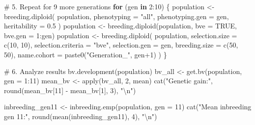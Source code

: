\documentclass[
  letterpaper,
]{book}
\newenvironment{Shaded}{\begin{snugshade}}{\end{snugshade}}
\newcommand{\AttributeTok}[1]{\textcolor[rgb]{0.40,0.45,0.13}{#1}}
\newcommand{\CommentTok}[1]{\textcolor[rgb]{0.37,0.37,0.37}{#1}}
\newcommand{\ConstantTok}[1]{\textcolor[rgb]{0.56,0.35,0.01}{#1}}
\newcommand{\ControlFlowTok}[1]{\textcolor[rgb]{0.00,0.23,0.31}{\textbf{#1}}}
\newcommand{\DecValTok}[1]{\textcolor[rgb]{0.68,0.00,0.00}{#1}}
\newcommand{\FloatTok}[1]{\textcolor[rgb]{0.68,0.00,0.00}{#1}}
\newcommand{\FunctionTok}[1]{\textcolor[rgb]{0.28,0.35,0.67}{#1}}
\newcommand{\NormalTok}[1]{\textcolor[rgb]{0.00,0.23,0.31}{#1}}
\newcommand{\OtherTok}[1]{\textcolor[rgb]{0.00,0.23,0.31}{#1}}
\newcommand{\SpecialCharTok}[1]{\textcolor[rgb]{0.37,0.37,0.37}{#1}}
\newcommand{\StringTok}[1]{\textcolor[rgb]{0.13,0.47,0.30}{#1}}
\begin{document}
\begin{Shaded}
\begin{Highlighting}[]
\CommentTok{\# 5. Repeat for 9 more generations}
\ControlFlowTok{for}\NormalTok{ (gen }\ControlFlowTok{in} \DecValTok{2}\SpecialCharTok{:}\DecValTok{10}\NormalTok{) \{}
\NormalTok{  population }\OtherTok{\textless{}{-}} \FunctionTok{breeding.diploid}\NormalTok{(}
\NormalTok{    population, }\AttributeTok{phenotyping =} \StringTok{"all"}\NormalTok{, }\AttributeTok{phenotyping.gen =}\NormalTok{ gen, }\AttributeTok{heritability =} \FloatTok{0.5}
\NormalTok{  )}
\NormalTok{  population }\OtherTok{\textless{}{-}} \FunctionTok{breeding.diploid}\NormalTok{(population, }\AttributeTok{bve =} \ConstantTok{TRUE}\NormalTok{, }\AttributeTok{bve.gen =} \DecValTok{1}\SpecialCharTok{:}\NormalTok{gen)}
\NormalTok{  population }\OtherTok{\textless{}{-}} \FunctionTok{breeding.diploid}\NormalTok{(}
\NormalTok{    population, }\AttributeTok{selection.size =} \FunctionTok{c}\NormalTok{(}\DecValTok{10}\NormalTok{, }\DecValTok{10}\NormalTok{), }\AttributeTok{selection.criteria =} \StringTok{"bve"}\NormalTok{,}
    \AttributeTok{selection.gen =}\NormalTok{ gen, }\AttributeTok{breeding.size =} \FunctionTok{c}\NormalTok{(}\DecValTok{50}\NormalTok{, }\DecValTok{50}\NormalTok{),}
    \AttributeTok{name.cohort =} \FunctionTok{paste0}\NormalTok{(}\StringTok{"Generation\_"}\NormalTok{, gen}\SpecialCharTok{+}\DecValTok{1}\NormalTok{)}
\NormalTok{  )}
\NormalTok{\}}

\CommentTok{\# 6. Analyze results}
\FunctionTok{bv.development}\NormalTok{(population)}
\NormalTok{bv\_all }\OtherTok{\textless{}{-}} \FunctionTok{get.bv}\NormalTok{(population, }\AttributeTok{gen =} \DecValTok{1}\SpecialCharTok{:}\DecValTok{11}\NormalTok{)}
\NormalTok{mean\_bv }\OtherTok{\textless{}{-}} \FunctionTok{apply}\NormalTok{(bv\_all, }\DecValTok{2}\NormalTok{, mean)}
\FunctionTok{cat}\NormalTok{(}\StringTok{"Genetic gain:"}\NormalTok{, }\FunctionTok{round}\NormalTok{(mean\_bv[}\DecValTok{11}\NormalTok{] }\SpecialCharTok{{-}}\NormalTok{ mean\_bv[}\DecValTok{1}\NormalTok{], }\DecValTok{3}\NormalTok{), }\StringTok{"}\SpecialCharTok{\textbackslash{}n}\StringTok{"}\NormalTok{)}

\NormalTok{inbreeding\_gen11 }\OtherTok{\textless{}{-}} \FunctionTok{inbreeding.emp}\NormalTok{(population, }\AttributeTok{gen =} \DecValTok{11}\NormalTok{)}
\FunctionTok{cat}\NormalTok{(}\StringTok{"Mean inbreeding gen 11:"}\NormalTok{, }\FunctionTok{round}\NormalTok{(}\FunctionTok{mean}\NormalTok{(inbreeding\_gen11), }\DecValTok{4}\NormalTok{), }\StringTok{"}\SpecialCharTok{\textbackslash{}n}\StringTok{"}\NormalTok{)}
\end{Highlighting}
\end{Shaded}
\end{document}
